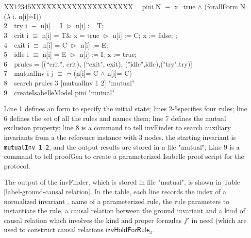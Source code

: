 \documentclass{llncs}
\newlength{\fminilength}
\newenvironment{fmini}[1][\linewidth]
  {\setlength{\fminilength}{#1\fboxsep-2\fboxrule}%
   \vspace{2ex}\noindent\begin{lrbox}{\fminibox}\begin{minipage}{\fminilength}%
   \mbox{ }\hfill\vspace{-2.5ex}}%
  {\end{minipage}\end{lrbox}\vspace{1ex}\hspace{0ex}%
   \framebox{\usebox{\fminibox}}}
\newenvironment{specification}
{\noindent\scriptsize
\tt\begin{fmini}\begin{tabbing}X\=X12345\=XXXX\=XXXX\=XXXX\=XXXX\=XXXX
\=\+\kill} {\end{tabbing}\normalfont\end{fmini}}
\def \twoSpaces {\ \ }
\begin{document}
\begin{specification}
1\twoSpaces   pini  N $\equiv$
   x=true $\wedge$ (forallForm N ($\lambda$ i. n[i]=I))\\

2\twoSpaces    try i $\equiv$ n[i] = I $\vartriangleright$ n[i] := T; \\

3\twoSpaces    crit i $\equiv$ n[i] = T\& x = true $\vartriangleright$  n[i] := C; x := false;  ;\\

4\twoSpaces   exit i $\equiv$ n[i] = C $\vartriangleright$ n[i] := E; \\


5\twoSpaces   idle  i $\equiv$  n[i] = E $\vartriangleright$ n[i] := I;  x := true;\\%
  
6\twoSpaces   prules  = [(``crit", crit), (``exit", exit), ("idle",idle),("try",try)]\\

7\twoSpaces mutualInv i j $\equiv$
  $\neg$ (n[i]= C $\wedge$ n[j]= C)\\

8\twoSpaces  search prules 3 [mutualInv 1 2] "mutual" \\

9\twoSpaces  createIsabelleModel pini "mutual" \\

\end{specification}

Line 1 defines an form to specify the initial state; lines 2-5specifies four rules; line 6 defines the set of all the rules and names them;
 line 7 defines the mutual exclusion property; line 8 is a command to tell {\sf invFinder} to search auxiliary invariants from a the reference instance with 3 nodes,   the starting invariant is {\tt mutualInv 1 2}, and the output results are stored in a file "mutual"; Line 9 is a command to tell {\sf proofGen} 
  to create a parameterized Isabelle proof script for the protocol.
  
 The output of the {\sf invFinder}, which is stored in file "mutual",  is shown in Table
\ref{label-ground-causal relation}. In the table,  each line records the    index of a normalized   invariant , name of a parameterized rule, the rule
  parameters to instantiate the rule, a causal relation between
  the ground invariant and a kind of causal relation which involves the kind and proper formulas
  $f'$   in need (which are used to construct
      causal relations $\mathsf{invHoldForRule}_3$.
\end{document}
